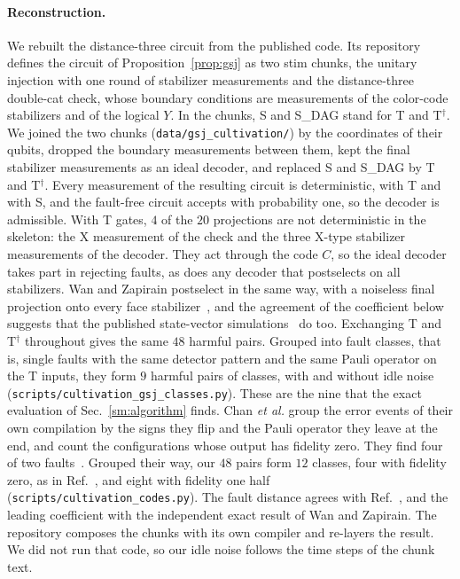 \documentclass[aps,prl,reprint,twocolumn,amsmath,amssymb,floatfix,nofootinbib,superscriptaddress]{revtex4-2}
\theoremstyle{definition}
\theoremstyle{remark}
\begin{document}
\paragraph*{Reconstruction.}
We rebuilt the distance-three circuit from the published code. Its repository defines the circuit of Proposition~\ref{prop:gsj} as two stim chunks, the unitary injection with one round of stabilizer measurements and the distance-three double-cat check, whose boundary conditions are measurements of the color-code stabilizers and of the logical $Y$. In the chunks, S and S\_DAG stand for T and T$^\dagger$. We joined the two chunks (\texttt{data/gsj\_cultivation/}) by the coordinates of their qubits, dropped the boundary measurements between them, kept the final stabilizer measurements as an ideal decoder, and replaced S and S\_DAG by T and T$^\dagger$. Every measurement of the resulting circuit is deterministic, with T and with S, and the fault-free circuit accepts with probability one, so the decoder is admissible. With T gates, $4$ of the $20$ projections are not deterministic in the skeleton: the X measurement of the check and the three X-type stabilizer measurements of the decoder. They act through the code $C$, so the ideal decoder takes part in rejecting faults, as does any decoder that postselects on all stabilizers. Wan and Zapirain postselect in the same way, with a noiseless final projection onto every face stabilizer~\cite{wanzapirain}, and the agreement of the coefficient below suggests that the published state-vector simulations~\cite{gsjcode} do too. Exchanging T and T$^\dagger$ throughout gives the same $48$ harmful pairs. Grouped into fault classes, that is, single faults with the same detector pattern and the same Pauli operator on the T inputs, they form $9$ harmful pairs of classes, with and without idle noise (\texttt{scripts/cultivation\_gsj\_classes.py}). These are the nine that the exact evaluation of Sec.~\ref{sm:algorithm} finds. Chan \emph{et al.} group the error events of their own compilation by the signs they flip and the Pauli operator they leave at the end, and count the configurations whose output has fidelity zero. They find four of two faults~\cite{chan}. Grouped their way, our $48$ pairs form $12$ classes, four with fidelity zero, as in Ref.~\cite{chan}, and eight with fidelity one half (\texttt{scripts/cultivation\_codes.py}). The fault distance agrees with Ref.~\cite{chan}, and the leading coefficient with the independent exact result of Wan and Zapirain. The repository composes the chunks with its own compiler and re-layers the result. We did not run that code, so our idle noise follows the time steps of the chunk text.
\end{document}

